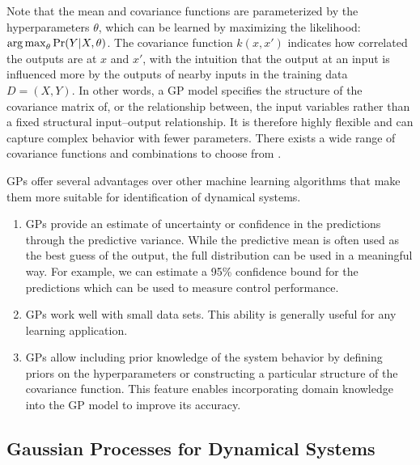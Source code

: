 Note that the mean and covariance functions are parameterized by the hyperparameters $\theta$, which can be learned by maximizing the likelihood: \(\operatorname*{arg\,max}_\theta \Pr(Y \vert X, \theta)\).
The covariance function \(k(x,x')\) indicates how correlated the outputs are at \(x\) and \(x'\), with the intuition that the output at an input is influenced more by the outputs of nearby inputs in the training data $D = (X, Y)$.
In other words, a GP model specifies the structure of the covariance matrix of, or the relationship between, the input variables rather than a fixed structural input--output relationship.
It is therefore highly flexible and can capture complex behavior with fewer parameters.
There exists a wide range of covariance functions and combinations to choose from \cite{Rasmussen2006}. 

GPs offer several advantages over other machine learning algorithms that make them more suitable for identification of dynamical systems.
\begin{enumerate}
\item GPs provide an estimate of uncertainty or confidence in the
  predictions through the predictive variance.  While the predictive mean is often used as the best guess of the output, the full distribution can be used in a meaningful way. For example, we can estimate a 95\% confidence bound for the predictions which can be used to measure control performance.
\item GPs work well with small data sets.  This ability is generally useful for any learning application.
\item GPs allow including prior knowledge of the system behavior by defining priors on the hyperparameters or constructing a particular structure of the covariance function.  This feature enables incorporating domain knowledge into the GP model to improve its accuracy.
\end{enumerate}

\subsection{Gaussian Processes for Dynamical Systems}
\label{SS:intro-gp:control}

